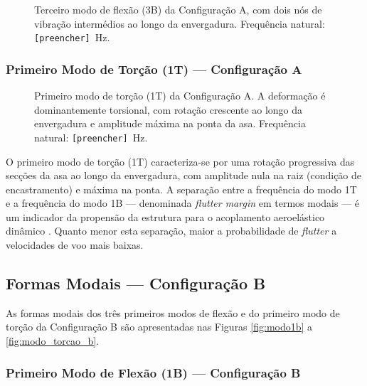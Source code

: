 \documentclass[a4paper,fleqn]{cas-sc}
\begin{document}
\begin{figure}
    \centering
    \caption{Terceiro modo de flexão (3B) da Configuração A, 
    com dois nós de vibração intermédios ao longo da 
    envergadura. Frequência natural: 
    \texttt{[preencher]}~\si{\hertz}.}
    \label{fig:modo3a}
\end{figure}

\subsubsection{Primeiro Modo de Torção (1T) --- Configuração A}

\begin{figure}
    \centering
    \caption{Primeiro modo de torção (1T) da Configuração A. 
    A deformação é dominantemente torsional, com rotação 
    crescente ao longo da envergadura e amplitude máxima 
    na ponta da asa. Frequência natural: 
    \texttt{[preencher]}~\si{\hertz}.}
    \label{fig:modo_torcao_a}
\end{figure}

O primeiro modo de torção (1T) caracteriza-se por uma rotação progressiva das secções da asa ao longo da envergadura, com amplitude nula na raiz (condição de encastramento) e máxima na ponta. A separação entre a frequência do modo 1T e a frequência do modo 1B --- denominada \textit{flutter margin} em termos modais --- é um indicador da propensão da estrutura para o acoplamento aeroelástico dinâmico \cite{Fung1993, Dowell2004}. Quanto menor esta separação, maior a probabilidade de \textit{flutter} a velocidades de voo mais baixas.

\subsection{Formas Modais --- Configuração B}

As formas modais dos três primeiros modos de flexão e do primeiro modo de torção da Configuração B são apresentadas nas Figuras \ref{fig:modo1b} a \ref{fig:modo_torcao_b}.

\subsubsection{Primeiro Modo de Flexão (1B) --- Configuração B}
\end{document}
